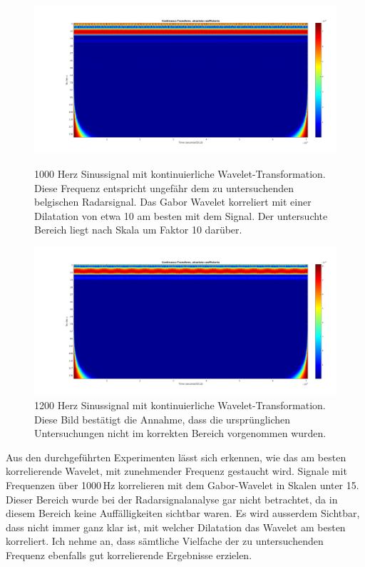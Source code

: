 \begin{refsection}
\begin{figure}
	\centering
	\includegraphics[width=0.9\linewidth]{papers/meteor/images/anomalie/beam/cwt_1000hz.png}
	\caption{1000 Herz Sinussignal mit kontinuierliche Wavelet-Transformation.
	Diese Frequenz entspricht ungefähr dem zu untersuchenden belgischen Radarsignal.
	Das Gabor Wavelet korreliert mit einer Dilatation von etwa 10 am besten mit dem Signal.
	Der untersuchte Bereich liegt nach Skala um Faktor 10 darüber.}
	\includegraphics[width=0.9\linewidth]{papers/meteor/images/anomalie/beam/cwt_1200hz.png}
	\caption{1200 Herz Sinussignal mit kontinuierliche Wavelet-Transformation.
	Diese Bild bestätigt die Annahme, dass die ursprünglichen Untersuchungen nicht im korrekten Bereich vorgenommen wurden.}
	\label{fig:cwt_anomalie_beam_2}
\end{figure}
Aus den durchgeführten Experimenten lässt sich erkennen, wie das am besten korrelierende Wavelet, mit zunehmender Frequenz gestaucht wird. 
Signale mit Frequenzen über 1000\,Hz korrelieren mit dem Gabor-Wavelet in Skalen unter 15.
Dieser Bereich wurde bei der Radarsignalanalyse gar nicht betrachtet, da in diesem Bereich keine Auffälligkeiten sichtbar waren. 
Es wird ausserdem Sichtbar, dass nicht immer ganz klar ist, mit welcher Dilatation das Wavelet am besten korreliert.
Ich nehme an, dass sämtliche Vielfache der zu untersuchenden Frequenz ebenfalls gut korrelierende Ergebnisse erzielen. 


\end{refsection}
